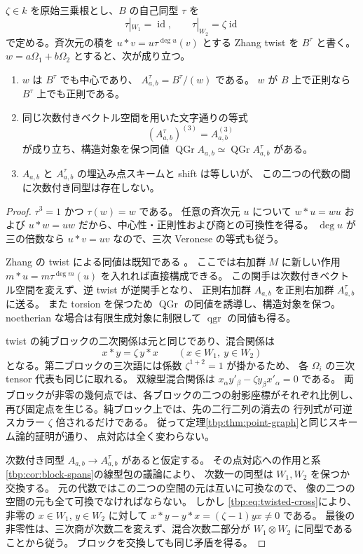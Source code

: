 \begin{proposition}
\label{tbp:prop:zhang-ambiguity}
$\zeta\in k$ を原始三乗根とし、$B$ の自己同型 $\tau$ を
\[
 \tau|_{W_1}=\operatorname{id},\qquad
 \tau|_{W_2}=\zeta\operatorname{id}
\]
で定める。斉次元の積を
$u*v=u\tau^{\deg u}(v)$ とする Zhang twist を $B^\tau$ と書く。
$w=a\Omega_1+b\Omega_2$ とすると、次が成り立つ。
\begin{enumerate}
 \item $w$ は $B^\tau$ でも中心であり、
 $A_{a,b}^\tau=B^\tau/(w)$ である。
 $w$ が $B$ 上で正則なら $B^\tau$ 上でも正則である。
 \item 同じ次数付きベクトル空間を用いた文字通りの等式
 \[
   (A_{a,b}^\tau)^{(3)}=A_{a,b}^{(3)}
 \]
 が成り立ち、構造対象を保つ同値
 $\operatorname{QGr}A_{a,b}\simeq\operatorname{QGr}A_{a,b}^\tau$ がある。
 \item $A_{a,b}$ と $A_{a,b}^\tau$ の埋込み点スキームと shift は等しいが、
 この二つの代数の間に次数付き同型は存在しない。
\end{enumerate}
\end{proposition}

\begin{proof}
$\tau^3=1$ かつ $\tau(w)=w$ である。
任意の斉次元 $u$ について
$w*u=wu$ および $u*w=uw$ だから、中心性・正則性および商との可換性を得る。
$\deg u$ が三の倍数なら $u*v=uv$ なので、三次 Veronese の等式も従う。

Zhang の twist による同値は既知である
\cite[Theorem~1.1]{TBPZhangTwist}。
ここでは右加群 $M$ に新しい作用
$m*u=m\tau^{\deg m}(u)$ を入れれば直接構成できる。
この関手は次数付きベクトル空間を変えず、逆 twist が逆関手となり、
正則右加群 $A_{a,b}$ を正則右加群 $A_{a,b}^\tau$ に送る。
また torsion を保つため $\operatorname{QGr}$ の同値を誘導し、構造対象を保つ。
noetherian な場合は有限生成対象に制限して $\operatorname{qgr}$ の同値も得る。

twist の純ブロックの二次関係は元と同じであり、混合関係は
\begin{equation}\label{tbp:eq:twisted-cross}
 x*y=\zeta\,y*x\qquad(x\in W_1,\ y\in W_2)
\end{equation}
となる。第二ブロックの三次語には係数 $\zeta^{1+2}=1$ が掛かるため、
各 $\Omega_i$ の三次 tensor 代表も同じに取れる。
双線型混合関係は
$x_\alpha y'_\beta-\zeta y_\beta x'_\alpha=0$ である。
両ブロックが非零の幾何点では、各ブロックの二つの射影座標がそれぞれ比例し、
再び固定点を生じる。純ブロック上では、先の二行二列の消去の
行列式が可逆スカラー $\zeta$ 倍されるだけである。
従って定理\ref{tbp:thm:point-graph}と同じスキーム論的証明が通り、
点対応は全く変わらない。

次数付き同型 $A_{a,b}\to A_{a,b}^\tau$ があると仮定する。
その点対応への作用と系\ref{tbp:cor:block-spans}の線型包の議論により、
次数一の同型は $W_1,W_2$ を保つか交換する。
元の代数ではこの二つの空間の元は互いに可換なので、
像の二つの空間の元も全て可換でなければならない。
しかし \eqref{tbp:eq:twisted-cross}により、非零の
$x\in W_1$, $y\in W_2$ に対して
$x*y-y*x=(\zeta-1)yx\ne0$ である。
最後の非零性は、三次商が次数二を変えず、混合次数二部分が
$W_1\otimes W_2$ に同型であることから従う。
ブロックを交換しても同じ矛盾を得る。
\end{proof}

